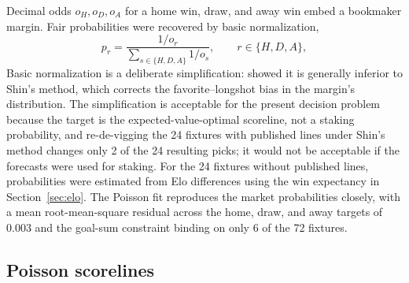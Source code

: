\documentclass[11pt,a4paper]{article}
\begin{document}
Decimal odds $o_H, o_D, o_A$ for a home win, draw, and away win embed a bookmaker margin. Fair probabilities were recovered by basic normalization,
\begin{equation}
p_r = \frac{1/o_r}{\sum_{s \in \{H,D,A\}} 1/o_s}, \qquad r \in \{H,D,A\},
\end{equation}
Basic normalization is a deliberate simplification: \citet{strumbelj2014} showed it is generally inferior to Shin's method, which corrects the favorite--longshot bias in the margin's distribution. The simplification is acceptable for the present decision problem because the target is the expected-value-optimal scoreline, not a staking probability, and re-de-vigging the 24 fixtures with published lines under Shin's method changes only 2 of the 24 resulting picks; it would not be acceptable if the forecasts were used for staking. For the 24 fixtures without published lines, probabilities were estimated from Elo differences using the win expectancy in Section~\ref{sec:elo}. The Poisson fit reproduces the market probabilities closely, with a mean root-mean-square residual across the home, draw, and away targets of 0.003 and the goal-sum constraint binding on only 6 of the 72 fixtures.

\subsection{Poisson scorelines}
\end{document}
